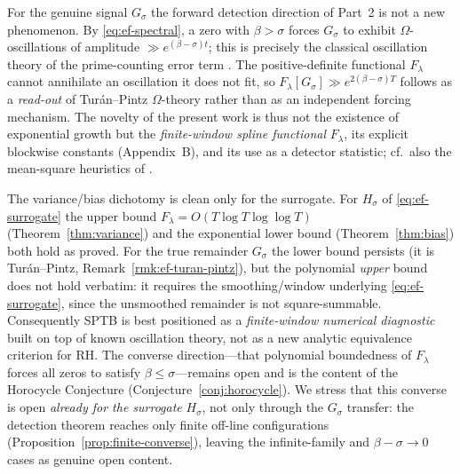 \begin{remark}\label{rmk:ef-turan-pintz}
For the genuine signal $G_\sigma$ the forward detection direction of Part~2 is
not a new phenomenon. By \eqref{eq:ef-spectral}, a zero with $\beta>\sigma$
forces $G_\sigma$ to exhibit $\Omega$-oscillations of amplitude
$\gg e^{(\beta-\sigma)t}$; this is precisely the classical oscillation theory
of the prime-counting error term \cite{turan,turan-pintz,ingham}. The
positive-definite functional $F_\lambda$ cannot annihilate an oscillation it
does not fit, so $F_\lambda[G_\sigma]\gg e^{2(\beta-\sigma)T}$ follows as a
\emph{read-out} of Tur\'an--Pintz $\Omega$-theory rather than as an independent
forcing mechanism. The novelty of the present work is thus not the existence of
exponential growth but the \emph{finite-window spline functional}
$F_\lambda$, its explicit blockwise constants (Appendix~B), and its use as a
detector statistic; cf.\ also the mean-square heuristics of
\cite{baezduarte,montgomery-pair}.
\end{remark}

\begin{remark}\label{rmk:ef-scope}
The variance/bias dichotomy is clean only for the surrogate. For $H_\sigma$ of
\eqref{eq:ef-surrogate} the upper bound $F_\lambda=O(T\log T\log\log T)$
(Theorem~\ref{thm:variance}) and the exponential lower bound
(Theorem~\ref{thm:bias}) both hold as proved. For the true remainder $G_\sigma$
the lower bound persists (it is Tur\'an--Pintz, Remark~\ref{rmk:ef-turan-pintz}),
but the polynomial \emph{upper} bound does not hold verbatim: it requires the
smoothing/window underlying \eqref{eq:ef-surrogate}, since the unsmoothed
remainder is not square-summable. Consequently SPTB is best positioned as a
\emph{finite-window numerical diagnostic} built on top of known oscillation
theory, not as a new analytic equivalence criterion for RH. The converse
direction---that polynomial boundedness of $F_\lambda$ forces all zeros to
satisfy $\beta\le\sigma$---remains open and is the content of the Horocycle
Conjecture (Conjecture~\ref{conj:horocycle}).  We stress that this converse is
open \emph{already for the surrogate} $H_\sigma$, not only through the
$G_\sigma$ transfer: the detection theorem reaches only finite off-line
configurations (Proposition~\ref{prop:finite-converse}), leaving the
infinite-family and $\beta-\sigma\to0$ cases as genuine open content.
\end{remark}
